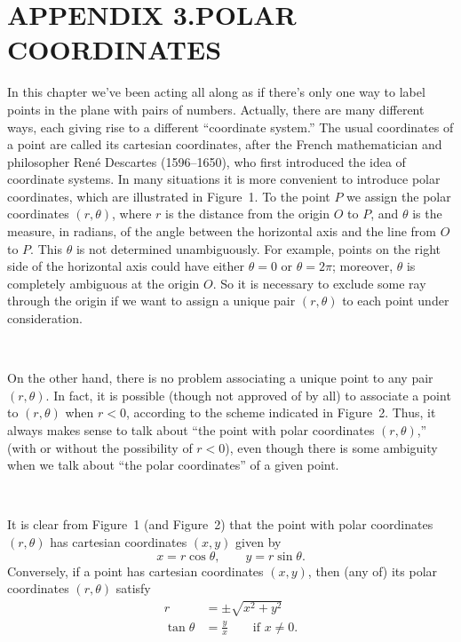 \section*{APPENDIX 3.\quad POLAR COORDINATES}

In this chapter we've been acting all along as if there's only one way to label
points in the plane with pairs of numbers. Actually, there are many different
ways, each giving rise to a different ``coordinate system.'' The usual
coordinates of a point are called its cartesian coordinates, after the French
mathematician and philosopher René Descartes (1596--1650), who first introduced
the idea of coordinate systems. In many situations it is more convenient to
introduce polar coordinates, which are illustrated in Figure~1. To the point
$P$ we assign the polar coordinates $(r,\theta)$, where $r$ is the distance
from the origin $O$ to $P$, and $\theta$ is the measure, in radians, of the
angle between the horizontal axis and the line from $O$ to $P$. This $\theta$
is not determined unambiguously. For example, points on the right side of the
horizontal axis could have either $\theta=0$ or $\theta=2\pi$; moreover,
$\theta$ is completely ambiguous at the origin $O$. So it is necessary to
exclude some ray through the origin if we want to assign a unique pair
$(r,\theta)$ to each point under consideration.

\begin{center}
\\[0.6em]
\end{center}

On the other hand, there is no problem associating a unique point to any pair
$(r,\theta)$. In fact, it is possible (though not approved of by all) to
associate a point to $(r,\theta)$ when $r<0$, according to the scheme indicated
in Figure~2. Thus, it always makes sense to talk about ``the point with polar
coordinates $(r,\theta)$,'' (with or without the possibility of $r<0$), even
though there is some ambiguity when we talk about ``the polar coordinates'' of
a given point.

\begin{center}
\\[0.6em]
\end{center}

It is clear from Figure~1 (and Figure~2) that the point with polar coordinates
$(r,\theta)$ has cartesian coordinates $(x,y)$ given by
\[
x=r\cos\theta,\qquad y=r\sin\theta.
\]
Conversely, if a point has cartesian coordinates $(x,y)$, then (any of) its
polar coordinates $(r,\theta)$ satisfy
\begin{align*}
r&=\pm\sqrt{x^2+y^2}\\
\tan\theta&=\frac yx \qquad\text{if }x\neq 0.
\end{align*}


